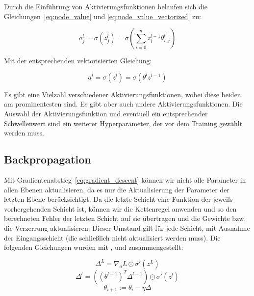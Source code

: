 Durch die Einführung von Aktivierungsfunktionen belaufen sich die Gleichungen~\eqref{eq:node_value} und \eqref{eq:node_value_vectorized} zu:

\begin{equation}
    a^l_j = \sigma(z^l_j) = \sigma(\sum^n_{i=0}z^{l-1}_i\theta^l_{i, j})
    \label{eq:activation}
\end{equation}

Mit der entsprechenden vektorisierten Gleichung:

\begin{equation}
    a^l = \sigma(z^l) = \sigma(\theta^l z^{l-1})
    \label{eq:activation_vectorized}
\end{equation}

Es gibt eine Vielzahl verschiedener Aktivierungsfunktionen, wobei diese beiden am prominentesten sind.
Es gibt aber auch andere Aktivierungsfunktionen.
Die Auswahl der Aktivierungsfunktion und eventuell ein entsprechender Schwellenwert sind ein weiterer Hyperparameter, der vor dem Training gewählt werden muss.

\subsection{Backpropagation}

Mit Gradientenabstieg~\eqref{eq:gradient_descent} können wir nicht alle Parameter in allen Ebenen aktualisieren, da es nur die Aktualisierung der Parameter der letzten Ebene berücksichtigt.
Da die letzte Schicht eine Funktion der jeweils vorhergehenden Schicht ist, können wir die Kettenregel anwenden und so den berechneten Fehler der letzten Schicht auf sie übertragen und die Gewichte bzw. die Verzerrung aktualisieren. Dieser Umstand gilt für jede Schicht, mit Ausnahme der Eingangsschicht (die schließlich nicht aktualisiert werden muss).
Die folgenden Gleichungen wurden mit \cite[S.733]{StuartRussell2018}, \cite[S.197]{Goodfellow2017} und \cite[ch.2]{Nielsen2015} zusammengestellt:

\begin{equation}
    \varDelta^L = \nabla_a L \odot \sigma'(z^L)
    \label{eq:output_error}
\end{equation}
\begin{equation}
    \varDelta^l = ((\theta^{l+1})^T \varDelta^{l+1}) \odot \sigma'(z^l)
    \label{eq:hidden_error}
\end{equation}
\begin{equation}
    \theta_{i+1} := \theta_i - \eta \varDelta
    \label{eq:backprop_update}
\end{equation}

